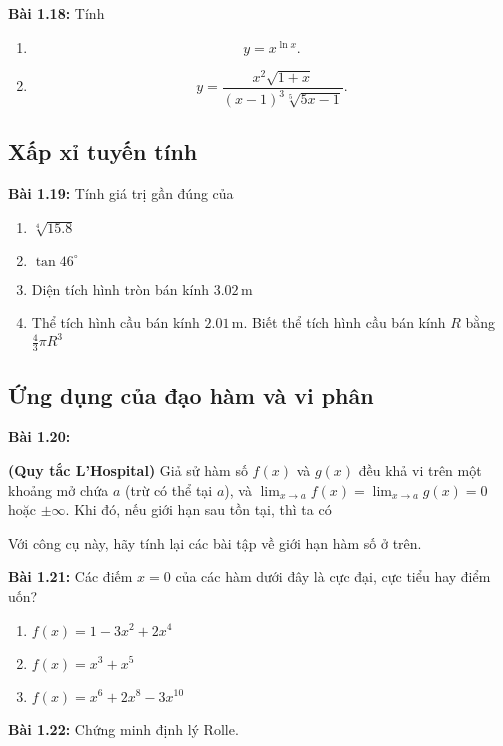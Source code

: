 \textbf{Bài 1.18:} Tính 
\begin{enumerate}[label=(\alph*)]
  \item \[y=x^{\ln x}.\]  
  \item \[y=\frac{x^2 \sqrt{1+x}}{(x-1)^3 \sqrt[5]{5x-1}}.\]
\end{enumerate}

\subsection*{Xấp xỉ tuyến tính}
\textbf{Bài 1.19:} Tính giá trị gần đúng của 
\begin{enumerate}[label=(\alph*)]
    \item $\sqrt[4]{15.8}$
    \item $\tan 46^\circ$
    \item Diện tích hình tròn bán kính $3.02\,\mathrm{m}$
    \item Thể tích hình cầu bán kính $2.01\,\mathrm{m}$. Biết thể tích hình cầu bán kính $R$ bằng $\frac{4}{3}\pi R^3$
\end{enumerate}
\vspace{5pt}



\subsection*{Ứng dụng của đạo hàm và vi phân}
\textbf{Bài 1.20:}
\begin{theorem}
\textbf{(Quy tắc L'Hospital)} Giả sử hàm số \(f(x)\) và \(g(x)\) đều khả vi trên một khoảng mở chứa \(a\) (trừ có thể tại \(a\)), và \(\lim_{x\rightarrow a}f(x)=\lim_{x\rightarrow a}g(x)=0\) hoặc \(\pm \infty\). Khi đó, nếu giới hạn sau tồn tại, thì ta có 
\end{theorem}
Với công cụ này, hãy tính lại các bài tập về giới hạn hàm số ở trên.
\vspace{5pt}


\textbf{Bài 1.21:} Các điếm \(x=0\) của các hàm dưới đây là cực đại, cực tiểu hay điểm uốn?
\begin{enumerate}[label=(\alph*)]
    \item \(f(x)=1-3x^2+2x^4\)
    \item \(f(x)=x^3+x^5\)
    \item \(f(x)=x^6+2x^8-3x^{10}\)
\end{enumerate}
\vspace{5pt}

\textbf{Bài 1.22:} Chứng minh định lý Rolle.
\vspace{5pt}

